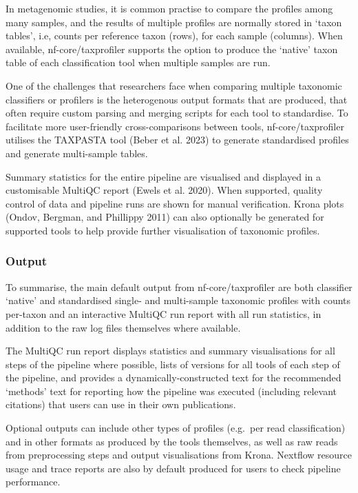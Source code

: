 \documentclass[
]{article}
\begin{document}
In metagenomic studies, it is common practise to compare the profiles
among many samples, and the results of multiple profiles are normally
stored in `taxon tables', i.e, counts per reference taxon (rows), for
each sample (columns). When available, nf-core/taxprofiler supports the
option to produce the `native' taxon table of each classification tool
when multiple samples are run.

One of the challenges that researchers face when comparing multiple
taxonomic classifiers or profilers is the heterogenous output formats
that are produced, that often require custom parsing and merging scripts
for each tool to standardise. To facilitate more user-friendly
cross-comparisons between tools, nf-core/taxprofiler utilises the
TAXPASTA tool (Beber et al. 2023) to generate standardised profiles and
generate multi-sample tables.

Summary statistics for the entire pipeline are visualised and displayed
in a customisable MultiQC report (Ewels et al. 2020). When supported,
quality control of data and pipeline runs are shown for manual
verification. Krona plots (Ondov, Bergman, and Phillippy 2011) can also
optionally be generated for supported tools to help provide further
visualisation of taxonomic profiles.

\hypertarget{output}{%
\subsubsection{Output}\label{output}}

To summarise, the main default output from nf-core/taxprofiler are both
classifier `native' and standardised single- and multi-sample taxonomic
profiles with counts per-taxon and an interactive MultiQC run report
with all run statistics, in addition to the raw log files themselves
where available.

The MultiQC run report displays statistics and summary visualisations
for all steps of the pipeline where possible, lists of versions for all
tools of each step of the pipeline, and provides a
dynamically-constructed text for the recommended `methods' text for
reporting how the pipeline was executed (including relevant citations)
that users can use in their own publications.

Optional outputs can include other types of profiles (e.g.~per read
classification) and in other formats as produced by the tools
themselves, as well as raw reads from preprocessing steps and output
visualisations from Krona. Nextflow resource usage and trace reports are
also by default produced for users to check pipeline performance.
\end{document}
